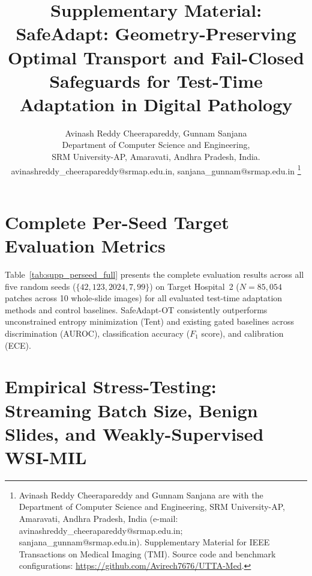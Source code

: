 \documentclass[journal]{IEEEtran}
\begin{document}
\title{Supplementary Material: SafeAdapt: Geometry-Preserving Optimal Transport and Fail-Closed Safeguards for Test-Time Adaptation in Digital Pathology}

\newif\ifblind
\blindfalse

\ifblind
\author{Anonymous~Authors%
\thanks{Supplementary Material submitted for double-blind peer review.}}
\else
\author{Avinash Reddy Cheerapareddy, Gunnam Sanjana\\
Department of Computer Science and Engineering,\\
SRM University-AP, Amaravati, Andhra Pradesh, India.\\
avinashreddy\_cheerapareddy@srmap.edu.in, sanjana\_gunnam@srmap.edu.in%
\thanks{Avinash Reddy Cheerapareddy and Gunnam Sanjana are with the Department of Computer Science and Engineering, SRM University-AP, Amaravati, Andhra Pradesh, India (e-mail: avinashreddy\_cheerapareddy@srmap.edu.in; sanjana\_gunnam@srmap.edu.in). Supplementary Material for IEEE Transactions on Medical Imaging (TMI). Source code and benchmark configurations: \url{https://github.com/Avirech7676/UTTA-Med}.}}
\fi

\maketitle

\section{Complete Per-Seed Target Evaluation Metrics}
\label{sec:supp_per_seed}

Table~\ref{tab:supp_perseed_full} presents the complete evaluation results across all five random seeds ($\{42, 123, 2024, 7, 99\}$) on Target Hospital~2 ($N=85{,}054$ patches across 10 whole-slide images) for all evaluated test-time adaptation methods and control baselines. SafeAdapt-OT consistently outperforms unconstrained entropy minimization (Tent) and existing gated baselines across discrimination (AUROC), classification accuracy ($F_1$ score), and calibration (ECE).

\section{Empirical Stress-Testing: Streaming Batch Size, Benign Slides, and Weakly-Supervised WSI-MIL}
\label{sec:supp_empirical_defenses}
\end{document}
